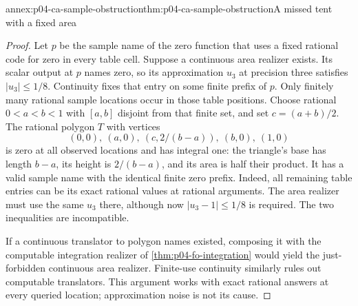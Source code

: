 \begin{annexitem}{annex:p04-ca-sample-obstruction}{thm:p04-ca-sample-obstruction}{A missed tent with a fixed area}
\begin{proof}
Let \(p\) be the sample name of the zero function that uses a fixed
rational code for zero in every table cell. Suppose a continuous area
realizer exists. Its scalar output at \(p\) names zero, so its
approximation \(u_3\) at precision three satisfies \(|u_3|\leq1/8\).
Continuity fixes that entry on some finite prefix of \(p\).
Only finitely many rational sample locations occur in those table
positions. Choose rational \(0<a<b<1\) with \([a,b]\)
disjoint from that finite set, and set \(c=(a+b)/2\).
The rational polygon \(T\) with vertices
\[
 (0,0),\ (a,0),\ (c,2/(b-a)),\ (b,0),\ (1,0)
\]
is zero at all observed locations and has integral one: the triangle's
base has length \(b-a\), its height is \(2/(b-a)\), and its area
is half their product.
It has a valid sample name with the identical finite zero prefix.
Indeed, all remaining table entries can be its exact rational values
at rational arguments. The area realizer must use the same \(u_3\)
there, although now \(|u_3-1|\leq1/8\) is required. The two
inequalities are incompatible.

If a continuous translator to polygon names existed, composing it
with the computable integration realizer of
\cref{thm:p04-fo-integration} would yield the just-forbidden continuous
area realizer. Finite-use continuity similarly rules out computable
translators. This argument works with exact rational answers at every
queried location; approximation noise is not its cause.
\end{proof}
\end{annexitem}

